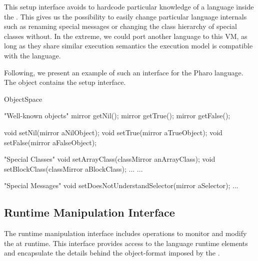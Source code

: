 This \VM setup interface avoids to hardcode particular knowledge of a language inside the \VM. This gives us the possibility to easily change particular language internals such as renaming special messages or changing the class hierarchy of special classes without. In the extreme, we could port another language to this VM, as long as they share similar execution semantics \ie the \VM execution model is compatible with the language.

Following, we present an example of such an interface for the Pharo language. The  object contains the \VM setup interface.

\begin{code}
ObjectSpace {
    "Well-known objects"
    mirror getNil();
    mirror getTrue();
    mirror getFalse();

    void setNil(mirror aNilObject);
    void setTrue(mirror aTrueObject);
    void setFalse(mirror aFalseObject);
    
    "Special Classes"
    void setArrayClass(classMirror anArrayClass);
    void setBlockClass(classMirror aBlockClass);
    ...
    ...
    
    "Special Messages"
    void setDoesNotUnderstandSelector(mirror aSelector);
    ...
}
\end{code}



\subsection{Runtime Manipulation Interface} 
The runtime manipulation interface includes operations to monitor and modify the \VM at runtime. This interface provides access to the language runtime elements and encapsulate the details behind the object-format imposed by the \VM.

